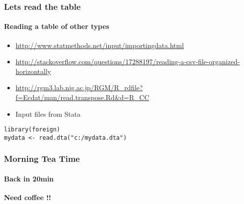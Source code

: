 \documentclass{article}\usepackage[]{graphicx}\usepackage[]{color}
\begin{document}
\begin{frame}[fragile]
  \frametitle{Lets read the table}
  \framesubtitle{Reading a table of other types}
\begin{itemize}  
\item \url{http://www.statmethods.net/input/importingdata.html}
\item \url{http://stackoverflow.com/questions/17288197/reading-a-csv-file-organized-horizontally}
\item \url{http://rgm3.lab.nig.ac.jp/RGM/R_rdfile?f=Ecdat/man/read.transpose.Rd&d=R_CC}
\item Input files from Stata
\end{itemize}
\begin{lstlisting} 
library(foreign)
mydata <- read.dta("c:/mydata.dta")  
\end{lstlisting} 
\end{frame}

\begin{frame}
  \frametitle{Morning Tea Time}
  \framesubtitle{Back in 20min}
  {\bf Need coffee !!} 
\end{frame}
\end{document}
